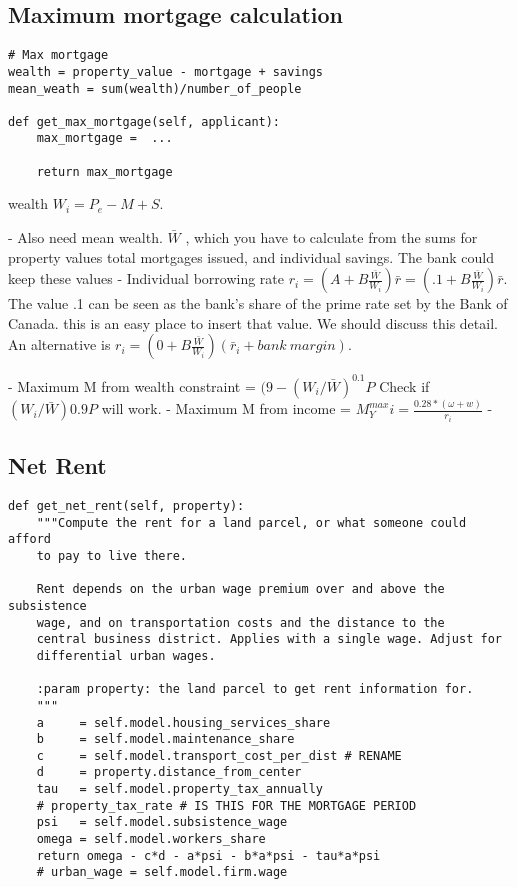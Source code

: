 \subsection{Maximum mortgage calculation}



\begin{lstlisting}
# Max mortgage
wealth = property_value - mortgage + savings
mean_weath = sum(wealth)/number_of_people

def get_max_mortgage(self, applicant):
    max_mortgage =  ...
    
    return max_mortgage
\end{lstlisting}


wealth $W_i = P_e-M+S$.  

- Also need mean wealth. $\bar W$ , which you have to calculate from the sums for property values total mortgages issued, and individual savings. The bank could keep these values
- Individual borrowing rate 
$r_i = (A + B \frac{\bar{W}}{W_i})\bar r=(.1 + B \frac{\bar{W}}{W_i})\bar r$.
The value .1 can be seen as the bank's share of the prime rate set by the Bank of Canada. this is an easy place to insert that value. We should discuss this detail. An alternative is
$r_i = (0 + B \frac{\bar{W}}{W_i})(\bar r_i+ bank\ margin)$.

- Maximum M  from wealth constraint = $(9-(W_i/\bar W)^{0.1}P$
  Check if $(W_i/\bar W)0.9P$ will work. 
- Maximum M  from income = $M^{max}_Yi = \frac{0.28*(\omega+w)}{r_i}$ 
- 

\subsection{Net Rent}

\begin{lstlisting}
def get_net_rent(self, property):
    """Compute the rent for a land parcel, or what someone could afford
    to pay to live there. 

    Rent depends on the urban wage premium over and above the subsistence
    wage, and on transportation costs and the distance to the
    central business district. Applies with a single wage. Adjust for
    differential urban wages.

    :param property: the land parcel to get rent information for.
    """
    a     = self.model.housing_services_share
    b     = self.model.maintenance_share
    c     = self.model.transport_cost_per_dist # RENAME
    d     = property.distance_from_center 
    tau   = self.model.property_tax_annually 
    # property_tax_rate # IS THIS FOR THE MORTGAGE PERIOD
    psi   = self.model.subsistence_wage
    omega = self.model.workers_share
    return omega - c*d - a*psi - b*a*psi - tau*a*psi
    # urban_wage = self.model.firm.wage
\end{lstlisting}

